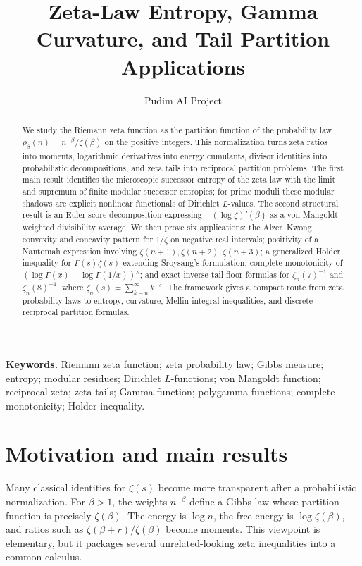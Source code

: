\documentclass[11pt]{article}
\title{Zeta-Law Entropy, Gamma Curvature, and Tail Partition Applications}
\author{Pudim AI Project}
\date{}
\numberwithin{equation}{section}
\theoremstyle{definition}
\theoremstyle{remark}
\newcommand{\1}{\mathbf 1}
\begin{document}
\maketitle

\begin{abstract}
We study the Riemann zeta function as the partition function of the probability law \(\rho_\beta(n)=n^{-\beta}/\zeta(\beta)\) on the positive integers.  This normalization turns zeta ratios into moments, logarithmic derivatives into energy cumulants, divisor identities into probabilistic decompositions, and zeta tails into reciprocal partition problems.  The first main result identifies the microscopic successor entropy of the zeta law with the limit and supremum of finite modular successor entropies; for prime moduli these modular shadows are explicit nonlinear functionals of Dirichlet \(L\)-values.  The second structural result is an Euler-score decomposition expressing \(-(\log\zeta)'(\beta)\) as a von Mangoldt-weighted divisibility average.  We then prove six applications: the Alzer--Kwong convexity and concavity pattern for \(1/\zeta\) on negative real intervals; positivity of a Nantomah expression involving \(\zeta(n+1),\zeta(n+2),\zeta(n+3)\); a generalized Holder inequality for \(\Gamma(s)\zeta(s)\) extending Sroysang's formulation; complete monotonicity of \((\log\Gamma(x)+\log\Gamma(1/x))''\); and exact inverse-tail floor formulas for \(\zeta_n(7)^{-1}\) and \(\zeta_n(8)^{-1}\), where \(\zeta_n(s)=\sum_{k=n}^{\infty}k^{-s}\).  The framework gives a compact route from zeta probability laws to entropy, curvature, Mellin-integral inequalities, and discrete reciprocal partition formulas.
\end{abstract}

\noindent\textbf{Keywords.} Riemann zeta function; zeta probability law; Gibbs measure; entropy; modular residues; Dirichlet \(L\)-functions; von Mangoldt function; reciprocal zeta; zeta tails; Gamma function; polygamma functions; complete monotonicity; Holder inequality.

\section{Motivation and main results}

Many classical identities for \(\zeta(s)\) become more transparent after a probabilistic normalization.  For \(\beta>1\), the weights \(n^{-\beta}\) define a Gibbs law whose partition function is precisely \(\zeta(\beta)\).  The energy is \(\log n\), the free energy is \(\log\zeta(\beta)\), and ratios such as \(\zeta(\beta+r)/\zeta(\beta)\) become moments.  This viewpoint is elementary, but it packages several unrelated-looking zeta inequalities into a common calculus.
\end{document}
